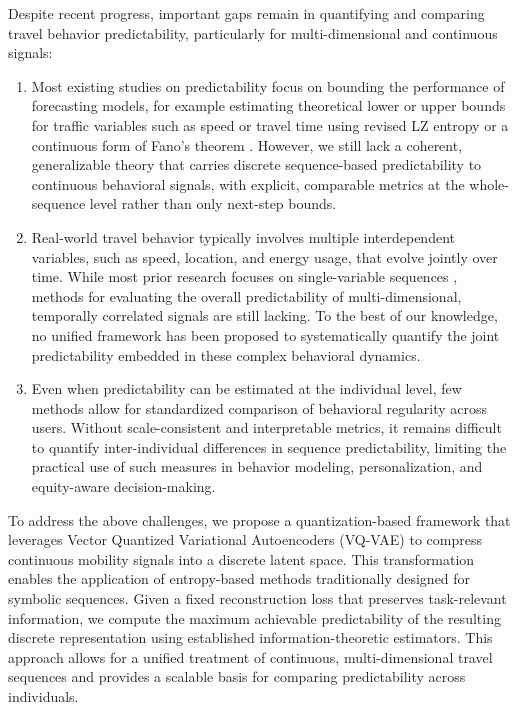 \documentclass[12pt,review,authoryear]{elsarticle}
\theoremstyle{upright}
\begin{document}
Despite recent progress, important gaps remain in quantifying and comparing travel behavior predictability, particularly for multi-dimensional and continuous signals:
\begin{enumerate}[(1)]
\item Most existing studies on predictability focus on bounding the performance of forecasting models, for example estimating theoretical lower or upper bounds for traffic variables such as speed or travel time using revised LZ entropy or a continuous form of Fano’s theorem \citep{li2022estimate,li2019travel}.
However, we still lack a coherent, generalizable theory that carries discrete sequence-based predictability to continuous behavioral signals, with explicit, comparable metrics at the whole-sequence level rather than only next-step bounds.

\item Real-world travel behavior typically involves multiple interdependent variables, such as speed, location, and energy usage, that evolve jointly over time. While most prior research focuses on single-variable sequences \citep{song2010limits,li2019travel,li2022estimate}, methods for evaluating the overall predictability of multi-dimensional, temporally correlated signals are still lacking. To the best of our knowledge, no unified framework has been proposed to systematically quantify the joint predictability embedded in these complex behavioral dynamics.

\item Even when predictability can be estimated at the individual level, few methods allow for standardized comparison of behavioral regularity across users. Without scale-consistent and interpretable metrics, it remains difficult to quantify inter-individual differences in sequence predictability, limiting the practical use of such measures in behavior modeling, personalization, and equity-aware decision-making.
\end{enumerate}


To address the above challenges, we propose a quantization-based framework that leverages Vector Quantized Variational Autoencoders (VQ-VAE) \citep{van2017neural} to compress continuous mobility signals into a discrete latent space. This transformation enables the application of entropy-based methods traditionally designed for symbolic sequences. Given a fixed reconstruction loss that preserves task-relevant information, we compute the maximum achievable predictability of the resulting discrete representation using established information-theoretic estimators. This approach allows for a unified treatment of continuous, multi-dimensional travel sequences and provides a scalable basis for comparing predictability across individuals.
\end{document}

